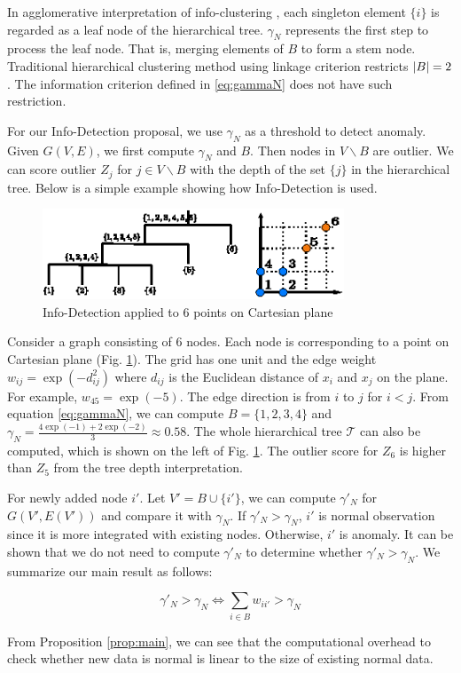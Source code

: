 \documentclass[runningheads]{llncs}
\begin{document}
In agglomerative interpretation of info-clustering \cite{RN8}, each singleton element $\{i\}$ is regarded as a leaf node of the hierarchical tree. $\gamma_N$ represents the first step to process the leaf node. That is, merging elements of $B$ to form a stem node. Traditional hierarchical clustering method using linkage criterion restricts $\lvert B\rvert=2$. The information criterion defined in \eqref{eq:gammaN} does not have such restriction. 

For our Info-Detection proposal, we use $\gamma_N$ as a threshold to detect anomaly. Given $G(V, E)$, we first compute $\gamma_N$ and $B$. Then nodes in $V\backslash B$  are outlier. We can score outlier $Z_j$ for $j \in V\backslash B$ with the depth of the set $\{j\}$ in the hierarchical tree. Below is a simple example showing how Info-Detection is used.
\begin{example}
	\begin{figure}[!ht]
		\centering
		\includegraphics[width=9cm]{pic/outlier_example.eps}
		\caption{Info-Detection applied to 6 points on Cartesian plane}\label{fig:ex}
	\end{figure}
	Consider a graph consisting of 6 nodes. Each node is corresponding to a point on Cartesian plane (Fig. \ref{fig:ex}). The grid has one unit and the edge weight $w_{ij} = \exp(-d_{ij}^2)$ where $d_{ij}$ is the Euclidean distance of $x_i$ and $x_j$ on the plane. For example, $w_{45} = \exp(-5)$. The edge direction is from $i$ to $j$ for $i<j$. From equation \eqref{eq:gammaN}, we can compute $B=\{1,2,3,4\}$ and $\gamma_N = \frac{4\exp(-1)+2\exp(-2)}{3}\approx 0.58$. The whole hierarchical tree $\mathcal{T}$ can also be computed, which is shown on the left of Fig. \ref{fig:ex}. The outlier score for $Z_6$ is higher than $Z_5$ from the tree depth interpretation.
\end{example}
For newly added node $i'$. Let $V'=B\cup \{i'\}$, we can compute $\gamma'_N$ for $G(V', E(V'))$ and compare it with $\gamma_N$. If $\gamma'_N>\gamma_N$, $i'$ is normal observation since it is more integrated with existing nodes. Otherwise, $i'$ is anomaly. It can be shown that we do not need to compute $\gamma'_N$ to determine whether $\gamma'_N>\gamma_N$. We summarize our main result as follows:
\begin{proposition}\label{prop:main}
\begin{equation}
\gamma'_N > \gamma_N \iff  \sum_{i \in B} w_{ii'} > \gamma_N 
\end{equation}
\end{proposition}
From Proposition \ref{prop:main}, we can see that the computational overhead to check whether new data is normal is linear to the size of existing normal data. 
\end{document}
